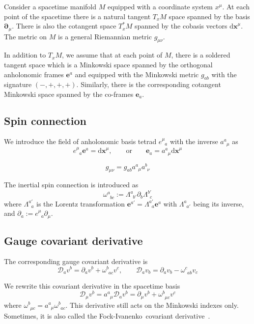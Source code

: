 \documentclass[
10pt, %
a4paper, %
oneside, %
headinclude,footinclude, %
BCOR5mm, %
]{scrartcl}
\newcommand{\xx}{\mathbf{x}}
\newcommand{\dx}{\mathrm{d}\xx}
\newcommand{\pd}{\partial}
\newcommand{\itetr}[2]{e^{#1}_{\phantom{#1}#2}}
\newcommand{\tetr}[2]{a^{#1}_{\phantom{#1}#2}}
\newcommand{\spin}[2]{\omega^{#1}_{\phantom{#1}#2}}
\newcommand{\Lor}[2]{\Lambda^{#1'}_{\phantom{#1}#2}}
\newcommand{\iLor}[2]{\Lambda^{#1}_{\phantom{#1}#2'}}
\newcommand{\D}[1]{\mathcal{D}_{#1}} %
\newcommand{\FI}{Fock-Ivanenko}
\begin{document}
Consider a spacetime manifold $ M $ equipped with a coordinate system $ x^\mu $. At each point of 
the spacetime there is a natural tangent $ T_{x}M $ space spanned by the basis $ \bm{\pd}_\mu $. 
There is also the cotangent space $ T_x^*M $ spanned by the cobasis vectors $ \bm{\dx}^\mu $.
The metric on $ M $ is a general Riemannian metric $ g_{\mu\nu} $.

In addition to $ T_{x}M $, we assume that at each point of $ M $, there is a soldered tangent space 
which is a Minkowski space spanned by the orthogonal anholonomic 
frames $ \bm{e}^a $ and equipped with the Minkowski metric $ g_{ab} $ with the signature $ 
(-,+,+,+) $. Similarly, there is the 
corresponding cotangent Minkowski space spanned by the co-frames $ \bm{e}_a $. 

\subsection{Spin connection}

We introduce the field of anholonomic basis tetrad $ \itetr{\mu}{a} $ with the inverse $ 
\tetr{a}{\mu} $ as
\begin{equation}
\itetr{\mu}{a} \bm{e}^a = \bm{\dx}^\mu, \qquad \text{or} \qquad \bm{e}_a = \tetr{a}{\mu}\bm{\dx}^\mu
\end{equation}


\begin{equation}
g_{\mu\nu} = g_{ab} \tetr{a}{\mu}\tetr{b}{\nu}
\end{equation}


The inertial spin connection is introduced as
\begin{equation}
\spin{a}{bc} := \iLor{a}{b}\pd_b\Lor{b}{c}
\end{equation}
where $ \Lor{a}{a} $ is the Lorentz transformation $ \bm{e}^{a'} = \Lor{a}{a} \bm{e}^a $ with $ 
\iLor{a}{a} $ being its inverse, and $ \pd_a := \itetr{\mu}{a} \pd_\mu $.

\subsection{Gauge covariant derivative}

The corresponding gauge covariant derivative is 
\begin{equation}
\D{a} v^b = \pd_a v^b + \spin{b}{ac} v^c, \qquad \D{a} v_b = \pd_a v_b - \spin{c}{ab} v_c
\end{equation}

We rewrite this covariant derivative in the spacetime basis
\begin{equation}
\D{\mu} v^b = \tetr{a}{\mu} \D{a} v^b = \pd_\mu v^b + \spin{b}{\mu c} v^c
\end{equation}
where $ \spin{b}{\mu c} = \tetr{a}{\mu}\spin{b}{ac} $.
This derivative still acts on the Minkowski indexes only. Sometimes, it is also called the \FI\ 
covariant derivative~\cite{AldrovandiPereiraBook}.
\end{document}
